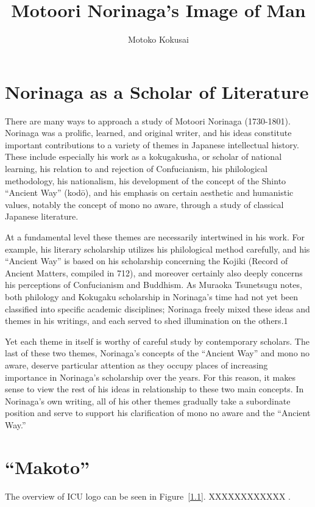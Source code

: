 \documentclass[12pt]{report}
\title{Motoori Norinaga’s Image of Man}
\author{Motoko Kokusai}
\date{}
\begin{document}

\doublespacing

\setcounter{tocdepth}{3}
\tableofcontents

\chapter{Norinaga as a Scholar of Literature}\label{intro}
There are many ways to approach a study of Motoori Norinaga (1730-1801). Norinaga was
a prolific, learned, and original writer, and his ideas constitute important contributions to a
variety of themes in Japanese intellectual history. These include especially his work as a
kokugakusha, or scholar of national learning, his relation to and rejection of Confucianism,
his philological methodology, his nationalism, his development of the concept of the Shinto
“Ancient Way” (kodō), and his emphasis on certain aesthetic and humanistic values, notably
the concept of mono no aware, through a study of classical Japanese literature.

At a fundamental level these themes are necessarily intertwined in his work. For
example, his literary scholarship utilizes his philological method carefully, and his “Ancient
Way” is based on his scholarship concerning the Kojiki (Record of Ancient Matters, compiled
in 712), and moreover certainly also deeply concerns his perceptions of Confucianism and
Buddhism. As Muraoka Tsunetsugu notes, both philology and Kokugaku scholarship in
Norinaga’s time had not yet been classified into specific academic disciplines; Norinaga
freely mixed these ideas and themes in his writings, and each served to shed illumination on
the others.1

Yet each theme in itself is worthy of careful study by contemporary scholars. The last of
these two themes, Norinaga’s concepts of the “Ancient Way” and mono no aware, deserve
particular attention as they occupy places of increasing importance in Norinaga’s scholarship
over the years. For this reason, it makes sense to view the rest of his ideas in relationship to
these two main concepts. In Norinaga’s own writing, all of his other themes gradually take
a subordinate position and serve to support his clarification of mono no aware and the
“Ancient Way.”


\chapter{“Makoto”}
The overview of ICU logo can be seen in Figure~\ref{1.1}.
XXXXXXXXXXXX \cite{Ishikawa1984}. 
\end{document}
